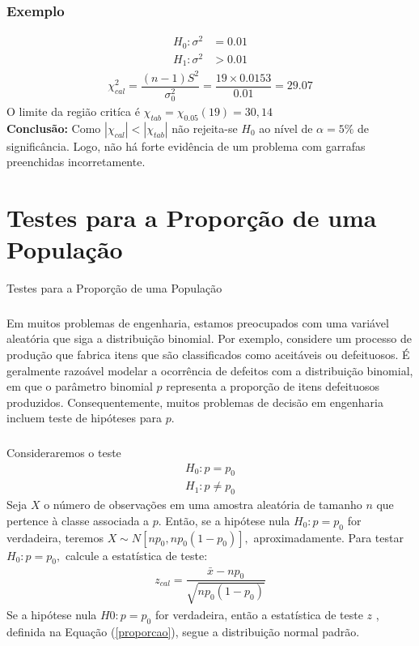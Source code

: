 \documentclass[14pt,aspectratio=1610]{beamer}
\newcommand{\bx}{\ensuremath{\bar{x}}}
\newcommand{\Ho}{\ensuremath{H_{0}}}
\begin{document}
\begin{frame}{}
\frametitle{Exemplo}
\begin{block}{}
\justifying
\begin{align*}
H_{0}: \sigma^{2}&=0.01 \\ 
H_{1}: \sigma^{2}&>0.01
\end{align*}
\begin{align}
\chi^{2}_{cal}=\dfrac{(n-1)S^{2}}{\sigma_{0}^{2}}=\dfrac{19\times0.0153}{0.01}=29.07
\end{align}
O limite da região critíca é $\chi_{tab}=\chi_{0.05}(19)=30,14$\\
\textbf{Conclusão:} Como $|\chi_{cal}|<|\chi_{tab}|$ não rejeita-se $\Ho$ ao nível de $\alpha=5\%$ de significância. Logo, não há forte evidência de um problema com 
garrafas preenchidas incorretamente.
\end{block}
\end{frame}

\section{Testes para a Proporção de uma População}
\begin{frame}{Testes para a Proporção de uma População}
\frametitle{}
\begin{block}{}
\justifying
Em muitos problemas de engenharia, estamos preocupados com uma variável aleatória que siga a distribuição binomial. Por exemplo, considere um processo de produção 
que fabrica itens que são classificados como aceitáveis ou defeituosos. É geralmente razoável modelar a ocorrência de defeitos com a distribuição binomial, em que o 
parâmetro binomial $p$ representa a proporção de itens defeituosos produzidos. Consequentemente, muitos problemas de decisão em engenharia incluem teste de 
hipóteses para $p.$
\end{block}
\end{frame}

\begin{frame}{}
\frametitle{}
\begin{block}{}
\justifying

Consideraremos o teste
\begin{align*}
H_{0}: p=p_{0}\\
H_{1}:p\neq p_{0}
\end{align*}
Seja $X$ o número de observações em uma amostra aleatória de tamanho $n$ que pertence 
à classe associada a $p.$ Então, se a hipótese nula $\Ho: p = p_{0}$ for verdadeira, teremos $X \sim N[np_{0}, np_{0}(1 - p_{0})],$ aproximadamente. Para testar 
$\Ho: p = p_{0},$ calcule a estatística de teste:
\begin{align}\label{proporcao}
z_{cal}=\dfrac{\bx-np_{0}}{\sqrt{np_{0}(1 - p_{0})}}
\end{align}
Se a hipótese nula $H0:p=p_{0}$ for verdadeira, então a estatística de teste $z$ , definida na Equação (\ref{proporcao}), segue a distribuição normal padrão.
\end{block}
\end{frame}
\end{document}
